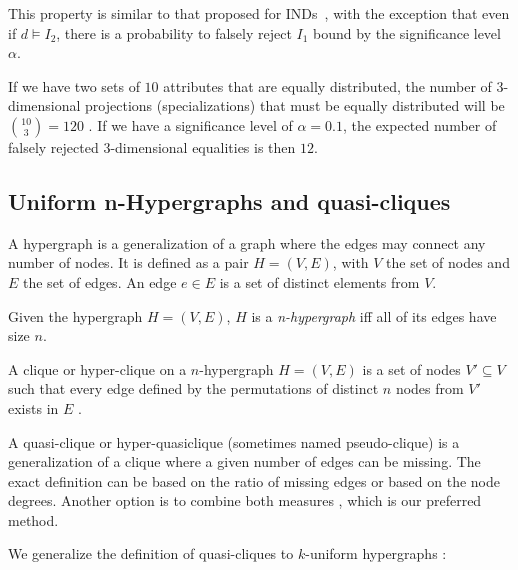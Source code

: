 
This property is similar to that proposed for \glspl{IND}~\cite{DeMarchi2002}, with the exception that even if $d \models I_2$, there is a probability to falsely reject $I_1$ bound by the significance level $\alpha$.

\begin{example}
    If we have two sets of $10$ attributes that are equally distributed, the number of
    3-dimensional projections (specializations) that must be equally distributed will be $\binom{10}{3} = 120$ .
    If we have a significance level of $\alpha = 0.1$, the expected number of
    falsely rejected 3-dimensional equalities is then $12$.
\end{example}

\subsection{Uniform n-Hypergraphs and quasi-cliques}

A hypergraph is a generalization of a graph where the edges may connect any number
of nodes.
It is defined as a pair $H = (V, E)$, with $V$ the set of nodes and $E$ the set of edges. An edge $e \in E$ is a set of distinct elements from $V$.

\begin{definition}
    \label{def:khypergraph}    
    Given the hypergraph $H = (V, E)$, $H$ is a \emph{n-hypergraph} iff
    all of its edges have size $n$.
\end{definition}

A clique or hyper-clique on a $n$-hypergraph $H = (V, E)$ is a set of nodes
$V' \subseteq V$ such that
every edge defined by the permutations of distinct $n$ nodes from $V'$ exists in $E$
\cite{koeller2003discovery}.

A quasi-clique or hyper-quasiclique (sometimes named pseudo-clique) is a generalization of a clique
where a given number of edges can be missing. The exact definition can be based
on the ratio of missing edges or based on the node degrees. Another option
is to combine both measures \cite{brunato2007effectively}, which is our preferred method.

We generalize the definition of quasi-cliques to $k$-uniform hypergraphs :

